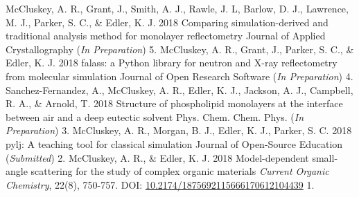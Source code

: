 \begin{cvpubys}
  \cvpuby
	{McCluskey, A. R., Grant, J., Smith, A. J., Rawle, J. L, Barlow, D. J., Lawrence, M. J., Parker, S. C., \& Edler, K. J.}
    {2018}
    {Comparing simulation-derived and traditional analysis method for monolayer reflectometry}
    {Journal of Applied Crystallography (\emph{In Preparation})}
    {5.}
  \cvpuby
    {McCluskey, A. R., Grant, J., Parker, S. C., \& Edler, K. J.}
    {2018}
    {falass: a Python library for neutron and X-ray reflectometry from molecular simulation}
    {Journal of Open Research Software (\emph{In Preparation})}
    {4.}
  \cvpuby
    {Sanchez-Fernandez, A., McCluskey, A. R., Edler, K. J., Jackson, A. J., Campbell, R. A., \& Arnold, T.}
    {2018}
    {Structure of phospholipid monolayers at the interface between air and a deep eutectic solvent}
    {Phys. Chem. Chem. Phys. (\emph{In Preparation})}
    {3.}
  \cvpuby
	{McCluskey, A. R., Morgan, B. J., Edler, K. J., Parker, S. C.}
	{2018}
	{pylj: A teaching tool for classical simulation}
	{Journal of Open-Source Education (\emph{Submitted})}
	{2.}
  \cvpuby
    {McCluskey, A. R., \& Edler, K. J.}
    {2018}
    {Model-dependent small-angle scattering for the study of complex organic materials}
	{\emph{Current Organic Chemistry}, 22(8), 750-757. DOI: \href{10.2174/1875692115666170612104439}{10.2174/1875692115666170612104439}}
    {1.}
\end{cvpubys}
